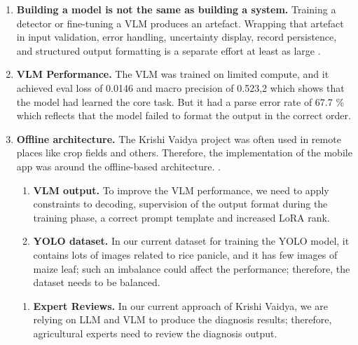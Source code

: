 \begin{enumerate}[label=\arabic*.]
\item \textbf{Building a model is not the same as building a system.} Training
a detector or fine-tuning a VLM produces an artefact. Wrapping that artefact
in input validation, error handling, uncertainty display, record persistence,
and structured output formatting is a separate effort at least as large
\parencite{sculleyMLTechDebt2015,paleyes2022MLSystemsChallenges}.

    \item \textbf{VLM Performance.} The VLM was trained on limited compute, and it achieved eval loss of 0.0146 and macro precision of 0.523,2 which shows that the model had learned the core task. But it had a parse error rate of 67.7 \% which reflects that the model failed to format the output in the correct order. 

    \item \textbf{Offline architecture.} The Krishi Vaidya project was often used in remote places like crop fields and others. Therefore, the implementation of the mobile app was around the offline-based architecture. \parencite{kleppmannLocalFirst2019}.



\begin{enumerate}[label=\arabic*.]


\item \textbf{VLM output.} To improve the VLM performance, we need to apply constraints to decoding, supervision of the output format during the training phase, a correct prompt template and increased LoRA rank.

\item \textbf{YOLO dataset.} In our current dataset for training the YOLO model, it contains lots of images related to rice panicle, and it has few images of maize leaf; such an imbalance could affect the performance; therefore, the dataset needs to be balanced. 


\end{enumerate}


\begin{enumerate}[label=\arabic*.]

\item \textbf{Expert Reviews. } In our current approach of Krishi Vaidya, we are relying on LLM and VLM to produce the diagnosis results; therefore, agricultural experts need to review the diagnosis output. 


\end{enumerate}
\end{enumerate}
